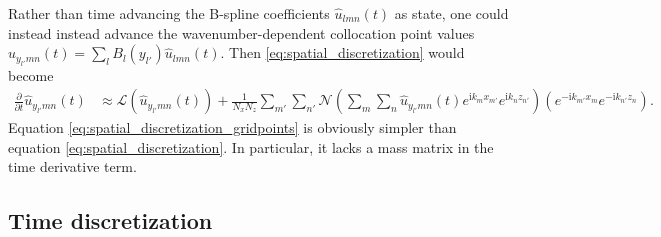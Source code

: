 \documentclass[letterpaper,11pt,nointlimits,reqno]{amsart}
\newcommand{\ii}{\ensuremath{\mathrm{i}}}
\begin{document}
Rather than time advancing the B-spline coefficients $\hat{u}_{l m n}(t)$ as
state, one could instead instead advance the wavenumber-dependent collocation
point values $\hat{u}_{y_{l'} m n}(t) = \sum_{l} B_l\!\left(y_{l'}\right)
\hat{u}_{l m n}(t)$.  Then \eqref{eq:spatial_discretization} would become
\begin{align}
  \frac{\partial}{\partial{}t} \hat{u}_{y_{l'} m n}(t)
  &\approx
  \mathscr{L}\left(\hat{u}_{y_{l'} m n}(t)\right)
  +
  \frac{1}{N_x N_z}
  \sum_{m'} \sum_{n'}
  \mathscr{N}\left(
    \sum_{m}
    \sum_{n}
    \hat{u}_{y_{l'} m n}(t)
    e^{\ii k_m x_{m'}}e^{\ii k_n z_{n'}}
  \right)
  \left(
    e^{-\ii k_{m'} x_m}e^{-\ii k_{n'} z_n}
  \right)
  .
  \label{eq:spatial_discretization_gridpoints}
\end{align}
Equation \eqref{eq:spatial_discretization_gridpoints} is obviously simpler than
equation \eqref{eq:spatial_discretization}.  In particular, it lacks a mass
matrix in the time derivative term.

\subsection{Time discretization}
\end{document}
